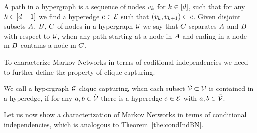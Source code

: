 \begin{definition}
	A path in a hypergraph is a sequence of nodes $v_{k}$ for $k\in[d]$, such that for any $k\in[d-1]$ we find a hyperedge $e\in\mathcal{E}$ such that $(v_{k}, v_{k+1})\subset e$.
	Given disjoint subsets $A$, $B$, $C$ of nodes in a hypergraph $\mathcal{G}$ we say that $C$ separates $A$ and $B$ with respect to $\mathcal{G}$, when any path starting at a node in $A$ and ending in a node in $B$ contains a node in $C$.
\end{definition}

To characterize Markov Networks in terms of coditional independencies we need to further define the property of clique-capturing.

\begin{definition}
	We call a hypergraph $\mathcal{G}$ clique-capturing, when each subset $\tilde{\mathcal{V}}\subset\mathcal{V}$ is contained in a hyperedge, if for any $a,b\in\tilde{\mathcal{V}}$ there is a hyperedge $e\in\mathcal{E}$ with $a,b\in\tilde{\mathcal{V}}$.
\end{definition}

Let us now show a characterization of Markov Networks in terms of conditional independencies, which is analogous to Theorem~\ref{the:condIndBN}.

